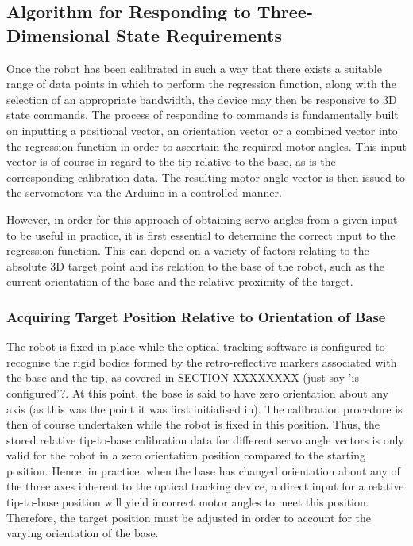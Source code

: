 \documentclass[11pt]{article}
\begin{document}
\subsection{Algorithm for Responding to Three-Dimensional State Requirements}
Once the robot has been calibrated in such a way that there exists a suitable range of data points in which to perform the regression function, along with the selection of an appropriate bandwidth, the device may then be responsive to 3D state commands.
The process of responding to commands is fundamentally built on inputting a positional vector, an orientation vector or a combined vector into the regression function in order to ascertain the required motor angles. This input vector is of course in regard to the tip relative to the base, as is the corresponding calibration data. The resulting motor angle vector is then issued to the servomotors via the Arduino in a controlled manner. 

However, in order for this approach of obtaining servo angles from a given input to be useful in practice, it is first essential to determine the correct input to the regression function. This can depend on a variety of factors relating to the absolute 3D target point and its relation to the base of the robot, such as the current orientation of the base and the relative proximity of the target.

\subsubsection{Acquiring Target Position Relative to Orientation of Base}
The robot is fixed in place while the optical tracking software is configured to recognise the rigid bodies formed by the retro-reflective markers associated with the base and the tip, as covered in SECTION XXXXXXXX (just say 'is configured'?. At this point, the base is said to have zero orientation about any axis (as this was the point it was first initialised in). The calibration procedure is then of course undertaken while the robot is fixed in this position. Thus, the stored relative tip-to-base calibration data for different servo angle vectors is only valid for the robot in a zero orientation position compared to the starting position. Hence, in practice, when the base has changed orientation about any of the three axes inherent to the optical tracking device, a direct input for a relative tip-to-base position will yield incorrect motor angles to meet this position. Therefore, the target position must be adjusted in order to account for the varying orientation of the base.
\end{document}

